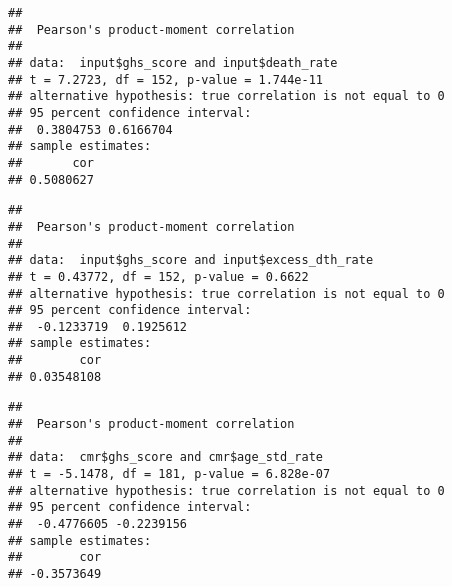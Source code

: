 \documentclass[
]{article}
\newenvironment{Shaded}{\begin{snugshade}}{\end{snugshade}}
\newcommand{\AttributeTok}[1]{\textcolor[rgb]{0.13,0.29,0.53}{#1}}
\newcommand{\FunctionTok}[1]{\textcolor[rgb]{0.13,0.29,0.53}{\textbf{#1}}}
\newcommand{\NormalTok}[1]{#1}
\newcommand{\SpecialCharTok}[1]{\textcolor[rgb]{0.81,0.36,0.00}{\textbf{#1}}}
\begin{document}
\begin{verbatim}
## 
##  Pearson's product-moment correlation
## 
## data:  input$ghs_score and input$death_rate
## t = 7.2723, df = 152, p-value = 1.744e-11
## alternative hypothesis: true correlation is not equal to 0
## 95 percent confidence interval:
##  0.3804753 0.6166704
## sample estimates:
##       cor 
## 0.5080627
\end{verbatim}

\begin{Shaded}
\end{Shaded}

\begin{verbatim}
## 
##  Pearson's product-moment correlation
## 
## data:  input$ghs_score and input$excess_dth_rate
## t = 0.43772, df = 152, p-value = 0.6622
## alternative hypothesis: true correlation is not equal to 0
## 95 percent confidence interval:
##  -0.1233719  0.1925612
## sample estimates:
##        cor 
## 0.03548108
\end{verbatim}

\begin{Shaded}
\end{Shaded}

\begin{verbatim}
## 
##  Pearson's product-moment correlation
## 
## data:  cmr$ghs_score and cmr$age_std_rate
## t = -5.1478, df = 181, p-value = 6.828e-07
## alternative hypothesis: true correlation is not equal to 0
## 95 percent confidence interval:
##  -0.4776605 -0.2239156
## sample estimates:
##        cor 
## -0.3573649
\end{verbatim}
\end{document}
